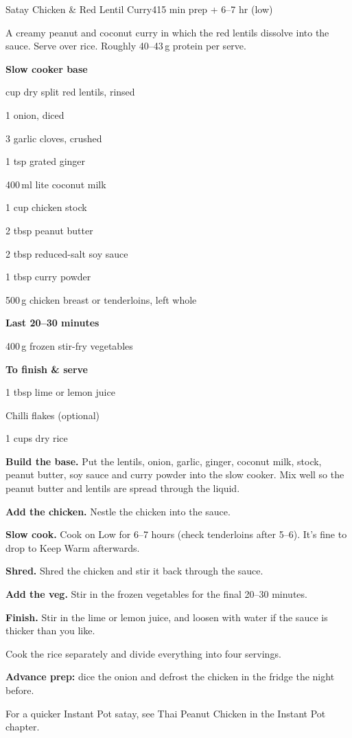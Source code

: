 \begin{recipebox}{Satay Chicken \& Red Lentil Curry}{4}{15 min prep + 6--7 hr (low)}

A creamy peanut and coconut curry in which the red lentils dissolve into the
sauce. Serve over rice. Roughly 40--43\,g protein per serve.

\begin{ingredients}
  \item[] \textbf{Slow cooker base}
  \item {} cup dry split red lentils, rinsed
  \item 1 onion, diced
  \item 3 garlic cloves, crushed
  \item 1 tsp grated ginger
  \item 400\,ml lite coconut milk
  \item 1 cup chicken stock
  \item 2 tbsp peanut butter
  \item 2 tbsp reduced-salt soy sauce
  \item 1 tbsp curry powder
  \item 500\,g chicken breast or tenderloins, left whole
  \item[] \textbf{Last 20--30 minutes}
  \item 400\,g frozen stir-fry vegetables
  \item[] \textbf{To finish \& serve}
  \item 1 tbsp lime or lemon juice
  \item Chilli flakes (optional)
  \item 1 cups dry rice
\end{ingredients}

\begin{method}
  \item \textbf{Build the base.} Put the lentils, onion, garlic, ginger, coconut milk, stock, peanut butter, soy sauce and curry powder into the slow cooker. Mix well so the peanut butter and lentils are spread through the liquid.
  \item \textbf{Add the chicken.} Nestle the chicken into the sauce.
  \item \textbf{Slow cook.} Cook on Low for 6--7 hours (check tenderloins after 5--6). It's fine to drop to Keep Warm afterwards.
  \item \textbf{Shred.} Shred the chicken and stir it back through the sauce.
  \item \textbf{Add the veg.} Stir in the frozen vegetables for the final 20--30 minutes.
  \item \textbf{Finish.} Stir in the lime or lemon juice, and loosen with water if the sauce is thicker than you like.
  \item Cook the rice separately and divide everything into four servings.
\end{method}

\begin{notelist}
  \item \textbf{Advance prep:} dice the onion and defrost the chicken in the fridge the night before.
  \item For a quicker Instant Pot satay, see Thai Peanut Chicken in the Instant Pot chapter.
\end{notelist}

\end{recipebox}
